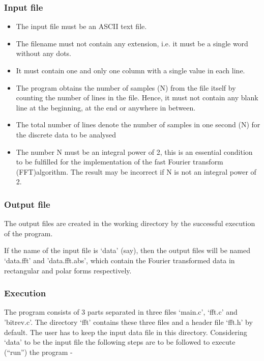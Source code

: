 \documentclass[a4paper,11pt]{report}
\begin{document}
\subsubsection{Input file}
\begin{itemize}
\item The input file must be an ASCII text file.
\item The filename must not contain any extension, i.e. it must be a single word without any dots.
\item It must contain one and only one column with a single value in each line.
\item The program obtains the number of samples (N) from the file itself by counting the number of lines in the file. Hence, it must not contain any blank line at the beginning, at the end or anywhere in between.
\item The total number of lines denote the number of samples in one second (N) for the discrete data to be analysed
\item The number N must be an integral power of 2, this is an essential condition to be fulfilled for the implementation of the fast Fourier transform (FFT)algorithm. The result may be incorrect if N is not an integral power of 2.  
\end{itemize}

\subsubsection{Output file}

The output files are created in the working directory by the successful execution of the program. 

If the name of the input file is `data' (say), then the output files will be named `data.fft' and 'data.fft.abs', which contain the Fourier transformed data in rectangular and polar forms respectively.

\subsubsection{Execution}

The program consists of 3 parts separated in three files `main.c', `fft.c' and 'bitrev.c'. The directory `fft' contains these three files and a header file `fft.h' by default. The user has to keep the input data file in this directory. Considering `data' to be the input file the following steps are to be followed to execute (``run'') the program - 
	
\end{document}
